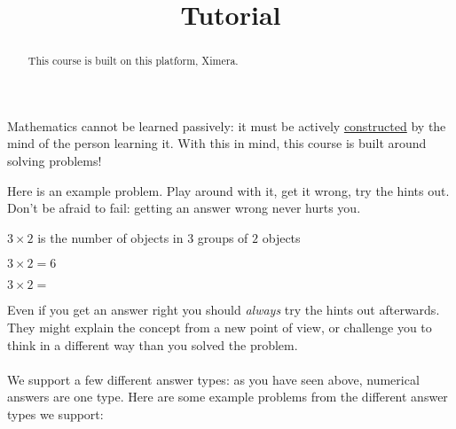 \documentclass{ximera}
\title{Tutorial}
\begin{document}
\begin{abstract}
  This course is built on this platform, Ximera.
\end{abstract}

Mathematics cannot be learned passively: it must be actively
\href{http://en.wikipedia.org/wiki/Constructivism_(philosophy_of_education)}{constructed}
by the mind of the person learning it.  With this in mind, this course
is built around solving problems!

Here is an example problem.  Play around with it, get it wrong, try
the hints out.  Don't be afraid to fail: getting an answer wrong never
hurts you.

\begin{problem}
  \begin{solution}
    \begin{hint}
      $3 \times 2$ is the number of objects in $3$ groups of $2$ objects
    \end{hint}
    \begin{hint}
    \end{hint}
    \begin{hint}
      $3\times 2=6$
    \end{hint}
    $3\times 2 = $ 
  \end{solution}
\end{problem}

Even if you get an answer right you should \textit{always} try the
hints out afterwards.  They might explain the concept from a new point
of view, or challenge you to think in a different way than you solved
the problem.
\\
\\
We support a few different answer types: as you have seen above,
numerical answers are one type.  Here are some example problems from
the different answer types we support:
\\
\\
\end{document}
